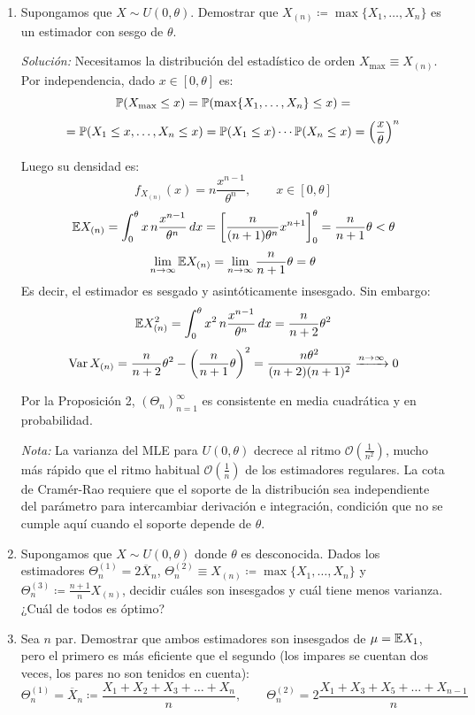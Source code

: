 \begin{enumerate}
  Por la Proposición 2, $(\Theta_n)_{n=1}^\infty$ es consistente en media cuadrática y en probabilidad.

  \item Supongamos que $X \sim U(0, \theta)$. Demostrar que $X_{(n)} \coloneqq \max\{X_1, \dots, X_n\}$ es un estimador con sesgo de $\theta$.

  \smallskip
  \noindent\textit{Solución:} Necesitamos la distribución del estadístico de orden $X_{\max} \equiv X_{(n)}$. Por independencia, dado $x \in [0, \theta]$ es:
  \[
    \mathbb{P}(X_{\max} \leq x) = \mathbb{P}(\max\{X_1, \dots, X_n\} \leq x) = \] 
    \[ =  \mathbb{P}(X_1 \leq x, \dots, X_n \leq x)  = \mathbb{P}(X_1 \leq x)\cdots\mathbb{P}(X_n \leq x) = \left(\frac{x}{\theta}\right)^n
  \]
 
  Luego su densidad es:
  \[
    f_{X_{(n)}}(x) = n\frac{x^{n-1}}{\theta^n}, \qquad x \in [0, \theta]
  \]
   \[
    \mathbb{E} X_{(n)} = \int_0^\theta x\,n\frac{x^{n-1}}{\theta^n}\,dx = \left[\frac{n}{(n+1)\theta^n}x^{n+1}\right]_0^\theta = \frac{n}{n+1}\theta < \theta
  \]
   \[
    \lim_{n\to\infty} \mathbb{E} X_{(n)} = \lim_{n\to\infty} \frac{n}{n+1}\theta = \theta
  \]
   Es decir, el estimador es sesgado y asintóticamente insesgado. Sin embargo:
  \[
    \mathbb{E} X_{(n)}^2 = \int_0^\theta x^2\,n\frac{x^{n-1}}{\theta^n}\,dx = \frac{n}{n+2}\theta^2
  \]
  \[
    \operatorname{Var} X_{(n)} = \frac{n}{n+2}\theta^2 - \left(\frac{n}{n+1}\theta\right)^2 = \frac{n\theta^2}{(n+2)(n+1)^2} \xrightarrow{n\to\infty} 0
  \]
 
  Por la Proposición 2, $(\Theta_n)_{n=1}^\infty$ es consistente en media cuadrática y en probabilidad.

  \smallskip
  \noindent\textit{Nota:} La varianza del MLE para $U(0, \theta)$ decrece al ritmo $\mathcal{O}(\frac{1}{n^2})$, mucho más rápido que el ritmo habitual $\mathcal{O}(\frac{1}{n})$ de los estimadores regulares. La cota de Cramér-Rao requiere que el soporte de la distribución sea independiente del parámetro para intercambiar derivación e integración, condición que no se cumple aquí cuando el soporte depende de $\theta$.

  \item Supongamos que $X \sim U(0, \theta)$ donde $\theta$ es desconocida. Dados los estimadores $\Theta_n^{(1)} = 2\overline{X}_n$, $\Theta_n^{(2)} \equiv X_{(n)} \coloneqq \max\{X_1, \dots, X_n\}$ y $\Theta_n^{(3)} \coloneqq \frac{n+1}{n}X_{(n)}$, decidir cuáles son insesgados y cuál tiene menos varianza. ¿Cuál de todos es óptimo?

  \item Sea $n$ par. Demostrar que ambos estimadores son insesgados de $\mu = \mathbb{E} X_1$, pero el primero es más eficiente que el segundo (los impares se cuentan dos veces, los pares no son tenidos en cuenta):
  \[
    \Theta_n^{(1)} = \overline{X}_n \coloneqq \frac{X_1 + X_2 + X_3 + \dots + X_n}{n}, \qquad \Theta_n^{(2)} = 2\frac{X_1 + X_3 + X_5 + \dots + X_{n-1}}{n}
  \]
 

\end{enumerate}
